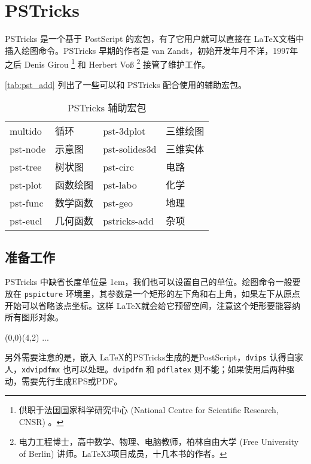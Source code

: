 \chapter{PSTricks}
\label{sec:pstricks}

PSTricks 是一个基于 PostScript 的宏包，有了它用户就可以直接在 \LaTeX 文档中插入绘图命令。PSTricks 早期的作者是 van Zandt\indexVanZandt ，初始开发年月不详，1997年之后 Denis Girou\indexGirou{} \footnote{供职于法国国家科学研究中心 (National Centre for Scientific Research, CNSR) 。} 和 Herbert Voß\indexVoss{} \footnote{电力工程博士，高中数学、物理、电脑教师，柏林自由大学 (Free University of Berlin) 讲师。\LaTeX{}3项目成员，十几本书的作者。} 接管了维护工作。

\autoref{tab:pst_add} 列出了一些可以和 PSTricks 配合使用的辅助宏包。

\begin{table}[htbp]
\caption{PSTricks 辅助宏包}
\label{tab:pst_add}
\centering
\begin{tabular}{llll}
  \toprule
  multido & 循环      & pst-3dplot & 三维绘图 \\
  pst-node & 示意图   & pst-solides3d & 三维实体 \\
  pst-tree & 树状图   & pst-circ & 电路 \\
  pst-plot & 函数绘图 & pst-labo & 化学 \\
  pst-func & 数学函数 & pst-geo & 地理 \\
  pst-eucl & 几何函数 & pstricks-add & 杂项 \\
  \bottomrule
\end{tabular}
\end{table}

\section{准备工作}
\label{sec:pst_setup}

PSTricks 中缺省长度单位是 1cm，我们也可以设置自己的单位。绘图命令一般要放在 \texttt{pspicture} 环境里，其参数是一个矩形的左下角和右上角，如果左下从原点开始可以省略该点坐标。这样 \LaTeX 就会给它预留空间，注意这个矩形要能容纳所有图形对象。

\begin{Code}[]
\begin{pspicture}(0,0)(4,2)
...
\end{pspicture}
\end{Code}

另外需要注意的是，嵌入 \LaTeX 的PSTricks生成的是PostScript，\texttt{dvips} 认得自家人，\texttt{xdvipdfmx} 也可以处理。\texttt{dvipdfm} 和 \texttt{pdflatex} 则不能；如果使用后两种驱动，需要先行生成EPS或PDF。

